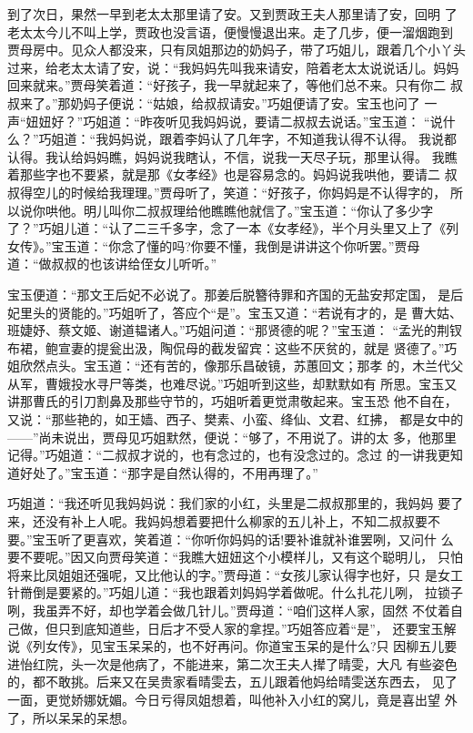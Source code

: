 到了次日，果然一早到老太太那里请了安。又到贾政王夫人那里请了安，回明
了老太太今儿不叫上学，贾政也没言语，便慢慢退出来。走了几步，便一溜烟跑到
贾母房中。见众人都没来，只有凤姐那边的奶妈子，带了巧姐儿，跟着几个小丫头
过来，给老太太请了安，说：“我妈妈先叫我来请安，陪着老太太说说话儿。妈妈
回来就来。”贾母笑着道：“好孩子，我一早就起来了，等他们总不来。只有你二
叔叔来了。”那奶妈子便说：“姑娘，给叔叔请安。”巧姐便请了安。宝玉也问了
一声“妞妞好？”巧姐道：“昨夜听见我妈妈说，要请二叔叔去说话。”宝玉道：
“说什么？”巧姐道：“我妈妈说，跟着李妈认了几年字，不知道我认得不认得。
我说都认得。我认给妈妈瞧，妈妈说我瞎认，不信，说我一天尽子玩，那里认得。
我瞧着那些字也不要紧，就是那《女孝经》也是容易念的。妈妈说我哄他，要请二
叔叔得空儿的时候给我理理。”贾母听了，笑道：“好孩子，你妈妈是不认得字的，
所以说你哄他。明儿叫你二叔叔理给他瞧瞧他就信了。”宝玉道：“你认了多少字
了？”巧姐儿道：“认了二三千多字，念了一本《女孝经》，半个月头里又上了《列
女传》。”宝玉道：“你念了懂的吗?你要不懂，我倒是讲讲这个你听罢。”贾母
道：“做叔叔的也该讲给侄女儿听听。”

宝玉便道：“那文王后妃不必说了。那姜后脱簪待罪和齐国的无盐安邦定国，
是后妃里头的贤能的。”巧姐听了，答应个“是”。宝玉又道：“若说有才的，是
曹大姑、班婕妤、蔡文姬、谢道韫诸人。”巧姐问道：“那贤德的呢？”宝玉道：
“孟光的荆钗布裙，鲍宣妻的提瓮出汲，陶侃母的截发留宾：这些不厌贫的，就是
贤德了。”巧姐欣然点头。宝玉道：“还有苦的，像那乐昌破镜，苏蕙回文；那孝
的，木兰代父从军，曹娥投水寻尸等类，也难尽说。”巧姐听到这些，却默默如有
所思。宝玉又讲那曹氏的引刀割鼻及那些守节的，巧姐听着更觉肃敬起来。宝玉恐
他不自在，又说：“那些艳的，如王嫱、西子、樊素、小蛮、绛仙、文君、红拂，
都是女中的——”尚未说出，贾母见巧姐默然，便说：“够了，不用说了。讲的太
多，他那里记得。”巧姐道：“二叔叔才说的，也有念过的，也有没念过的。念过
的一讲我更知道好处了。”宝玉道：“那字是自然认得的，不用再理了。”

巧姐道：“我还听见我妈妈说：我们家的小红，头里是二叔叔那里的，我妈妈
要了来，还没有补上人呢。我妈妈想着要把什么柳家的五儿补上，不知二叔叔要不
要。”宝玉听了更喜欢，笑着道：“你听你妈妈的话!要补谁就补谁罢咧，又问什
么要不要呢。”因又向贾母笑道：“我瞧大妞妞这个小模样儿，又有这个聪明儿，
只怕将来比凤姐姐还强呢，又比他认的字。”贾母道：“女孩儿家认得字也好，只
是女工针黹倒是要紧的。”巧姐儿道：“我也跟着刘妈妈学着做呢。什么扎花儿咧，
拉锁子咧，我虽弄不好，却也学着会做几针儿。”贾母道：“咱们这样人家，固然
不仗着自己做，但只到底知道些，日后才不受人家的拿捏。”巧姐答应着“是”，
还要宝玉解说《列女传》，见宝玉呆呆的，也不好再问。你道宝玉呆的是什么?只
因柳五儿要进怡红院，头一次是他病了，不能进来，第二次王夫人撵了晴雯，大凡
有些姿色的，都不敢挑。后来又在吴贵家看晴雯去，五儿跟着他妈给晴雯送东西去，
见了一面，更觉娇娜妩媚。今日亏得凤姐想着，叫他补入小红的窝儿，竟是喜出望
外了，所以呆呆的呆想。


